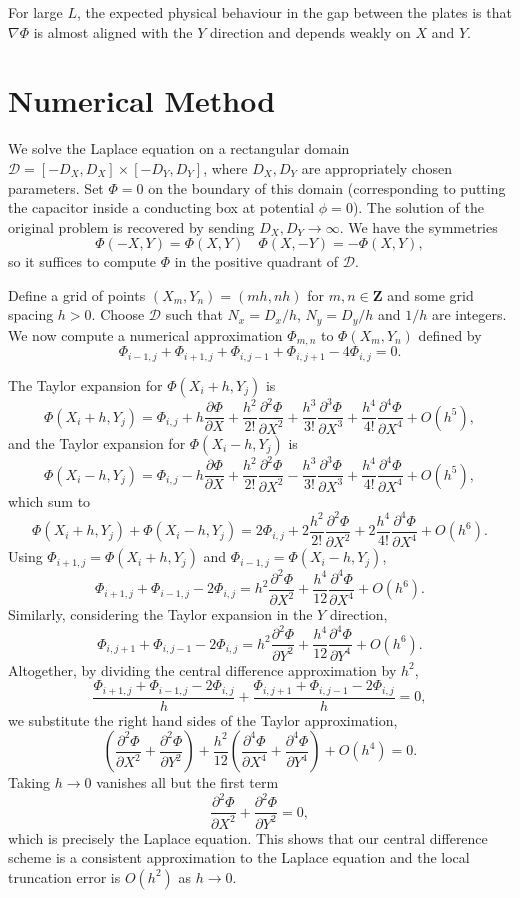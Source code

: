 \documentclass{article}
\newcommand{\pder}[2][]{\frac{\partial#1}{\partial#2}}
\newcommand{\spder}[2][]{\frac{\partial^2#1}{\partial#2^2}}
\newcommand{\tpder}[2][]{\frac{\partial^3#1}{\partial#2^3}}
\newcommand{\fpder}[2][]{\frac{\partial^4#1}{\partial#2^4}}
\begin{document}
For large \(L\), the expected physical behaviour in the gap between the plates is that \(\nabla \Phi\) is almost aligned with the \(Y\) direction and depends weakly on \(X\) and \(Y\).

\section{Numerical Method}

We solve the Laplace equation on a rectangular domain \(\mathcal{D} = [-D_X, D_X] \times [-D_Y, D_Y]\), where \(D_X, D_Y\) are appropriately chosen parameters. Set \(\Phi = 0\) on the boundary of this domain (corresponding to putting the capacitor inside a conducting box at potential \(\phi = 0\)). The solution of the original problem is recovered by sending \(D_X,D_Y \to \infty\). We have the symmetries
\[ \Phi(-X,Y) = \Phi(X,Y) \quad \Phi(X,-Y) = -\Phi(X,Y), \] 
so it suffices to compute \(\Phi\) in the positive quadrant of \(\mathcal{D}\).

Define a grid of points \((X_m, Y_n) = (mh, nh)\) for \(m,n\in\mathbf{Z}\) and some grid spacing \(h > 0\). Choose \(\mathcal{D}\) such that \(N_x = D_x/h\), \(N_y = D_y/h\) and \(1/h\) are integers. We now compute a numerical approximation \(\Phi_{m,n}\) to \(\Phi(X_m, Y_n)\) defined by
\[ \Phi_{i-1,j} + \Phi_{i+1,j} + \Phi_{i,j-1} + \Phi_{i,j+1} - 4\Phi_{i,j} = 0. \]

The Taylor expansion for \(\Phi(X_i + h, Y_j)\) is
\[ \Phi(X_i + h, Y_j) = \Phi_{i,j} + h\pder[\Phi]{X} + \frac{h^2}{2!}\spder[\Phi]{X} + \frac{h^3}{3!}\tpder[\Phi]{X} + \frac{h^4}{4!}\fpder[\Phi]{X} + O(h^5), \]
and the Taylor expansion for \(\Phi(X_i - h, Y_j)\) is
\[ \Phi(X_i - h, Y_j) = \Phi_{i,j} - h\pder[\Phi]{X} + \frac{h^2}{2!}\spder[\Phi]{X} - \frac{h^3}{3!}\tpder[\Phi]{X} + \frac{h^4}{4!}\fpder[\Phi]{X} + O(h^5), \]
which sum to
\[ \Phi(X_i + h, Y_j) + \Phi(X_i - h, Y_j) = 2\Phi_{i,j} + 2\frac{h^2}{2!}\spder[\Phi]{X} + 2\frac{h^4}{4!}\fpder[\Phi]{X} + O(h^6). \]
Using \(\Phi_{i+1,j} = \Phi(X_i + h, Y_j)\) and \(\Phi_{i-1,j} = \Phi(X_i - h, Y_j)\),
\[ \Phi_{i+1,j} + \Phi_{i-1,j} - 2\Phi_{i,j} = h^2\spder[\Phi]{X} + \frac{h^4}{12}\fpder[\Phi]{X} + O(h^6). \]
Similarly, considering the Taylor expansion in the \(Y\) direction,
\[ \Phi_{i,j+1} + \Phi_{i,j-1} - 2\Phi_{i,j} = h^2\spder[\Phi]{Y} + \frac{h^4}{12}\fpder[\Phi]{Y} + O(h^6). \]
Altogether, by dividing the central difference approximation by \(h^2\),
\[ \frac{\Phi_{i+1,j} + \Phi_{i-1,j} - 2\Phi_{i,j}}{h} + \frac{\Phi_{i,j+1} + \Phi_{i,j-1} - 2\Phi_{i,j}}{h} = 0, \]
we substitute the right hand sides of the Taylor approximation, 
\[ \left(\spder[\Phi]{X} + \spder[\Phi]{Y}\right) + \frac{h^2}{12}\left(\fpder[\Phi]{X} + \fpder[\Phi]{Y}\right) + O(h^4) = 0. \]
Taking \(h \to 0\) vanishes all but the first term
\[ \spder[\Phi]{X} + \spder[\Phi]{Y} = 0, \]
which is precisely the Laplace equation. This shows that our central difference scheme is a consistent approximation to the Laplace equation and the local truncation error is \(O(h^2)\) as \(h \to 0\).
\end{document}
